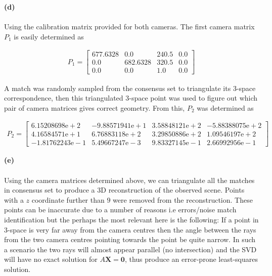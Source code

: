 \begin{homeworkProblem}
  \pagebreak

  \textbf{(d)}
  \\
  \\

  Using the calibration matrix provided for both cameras. The first camera
  matrix $P_1$ is easily determined as 

  \begin{align*}
    P_1 = \begin{bmatrix}
      677.6328 &   0.0    & 240.5   &   0.0 \\
      0.0    & 682.6328 & 320.5  &    0.0   \\
      0.0    &   0.0    &   1.0    &   0.0
    \end{bmatrix}
  \end{align*}

  A match was randomly sampled from the consensus set to triangulate its
  3-space correspondence, then this triangulated 3-space point was used to
  figure out which pair of camera matrices gives correct geometry. From this,
  $P_2$ was determined as

  \begin{align*}
    P_2 = \begin{bmatrix}
            6.15208698\mathrm{e+}2 & -9.88571941\mathrm{e+}1 &  3.58848121\mathrm{e+}2 & -5.88388075\mathrm{e+}2 \\
            4.16584571\mathrm{e+}1 & 6.76883118\mathrm{e+}2 &
            3.29850886\mathrm{e+}2 &  1.09546197\mathrm{e}+2 \\
            -1.81762243\mathrm{e-}1 &  5.49667247\mathrm{e-}3 &
            9.83327145\mathrm{e-}1 & 2.66992956\mathrm{e-}1
         \end{bmatrix}
  \end{align*}


  \textbf{(e)}
  \\
  \\
  Using the camera matrices determined above, we can triangulate all the matches
  in consensus set to produce a 3D reconstruction of the observed scene. Points
  with a $z$ coordinate further than $9$ were removed from the
  reconstruction. These points can be inaccurate due to a number of reasons i.e
  errors/noise match identification but the perhaps the most relevant here is
  the following: If a point in 3-space is very far away from the camera centres
  then the angle between the rays from the two camera centres pointing towards the point
  be quite narrow. In such a scenario the two rays will almost appear parallel
  (no intersection) and the SVD will have no exact solution for
  $A\mathbf{X} = \mathbf{0}$, thus produce an error-prone least-squares solution.


\end{homeworkProblem}
